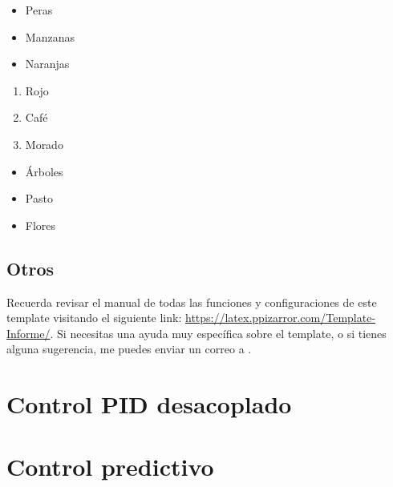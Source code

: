 		\begin{multicols}{3}
			\begin{itemize}[label={--}]
				\item Peras
				\item Manzanas
				\item Naranjas
			\end{itemize}

			\begin{enumerate}[label={*}]
				\item Rojo
				\item Café
				\item Morado
			\end{enumerate}

			\begin{itemize}
				\item Árboles
				\item Pasto
				\item Flores
			\end{itemize}
		\end{multicols}

	\subsection{Otros}

		Recuerda revisar el manual de todas las funciones y configuraciones de este template visitando el siguiente link: \url{https://latex.ppizarror.com/Template-Informe/}. Si necesitas una ayuda muy específica sobre el template, o si tienes alguna sugerencia, me puedes enviar un correo a .



\newpage
\section{Control PID desacoplado}




\newpage
\section{Control predictivo}


